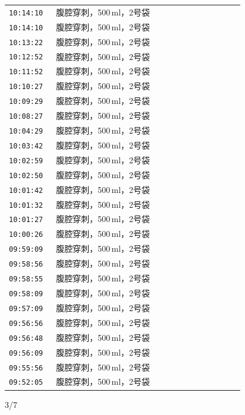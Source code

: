 \documentclass[UTF8,10pt,a4paper,fontset=fandol]{ctexart}
\newcommand{\handwritten}[1]{#1}
\begin{document}
\begin{tabular}{p{0.18\linewidth}p{0.72\linewidth}}
\texttt{10:14:10} & 腹腔穿刺，500\,ml，2号袋 \\
\texttt{10:14:10} & 腹腔穿刺，500\,ml，2号袋 \\
\texttt{10:13:22} & 腹腔穿刺，500\,ml，2号袋 \\
\texttt{10:12:52} & 腹腔穿刺，500\,ml，2号袋 \\
\texttt{10:11:52} & 腹腔穿刺，500\,ml，2号袋 \\
\texttt{10:10:27} & 腹腔穿刺，500\,ml，2号袋 \\
\texttt{10:09:29} & 腹腔穿刺，500\,ml，2号袋 \\
\texttt{10:08:27} & 腹腔穿刺，500\,ml，2号袋 \\
\texttt{10:04:29} & 腹腔穿刺，500\,ml，2号袋 \\
\texttt{10:03:42} & 腹腔穿刺，500\,ml，2号袋 \\
\texttt{10:02:59} & 腹腔穿刺，500\,ml，2号袋 \\
\texttt{10:02:50} & 腹腔穿刺，500\,ml，2号袋 \\
\texttt{10:01:42} & 腹腔穿刺，500\,ml，2号袋 \\
\texttt{10:01:32} & 腹腔穿刺，500\,ml，2号袋 \\
\texttt{10:01:27} & 腹腔穿刺，500\,ml，2号袋 \\
\texttt{10:00:26} & 腹腔穿刺，500\,ml，2号袋 \\
\texttt{09:59:09} & 腹腔穿刺，500\,ml，2号袋 \\
\texttt{09:58:56} & 腹腔穿刺，500\,ml，2号袋 \\
\texttt{09:58:55} & 腹腔穿刺，500\,ml，2号袋 \\
\texttt{09:58:09} & 腹腔穿刺，500\,ml，2号袋 \\
\texttt{09:57:09} & 腹腔穿刺，500\,ml，2号袋 \\
\texttt{09:56:56} & 腹腔穿刺，500\,ml，2号袋 \\
\texttt{09:56:48} & 腹腔穿刺，500\,ml，2号袋 \\
\texttt{09:56:09} & 腹腔穿刺，500\,ml，2号袋 \\
\texttt{09:55:56} & 腹腔穿刺，500\,ml，2号袋 \\
\texttt{09:52:05} & 腹腔穿刺，500\,ml，2号袋 \\
\end{tabular}

\handwritten{3/7}
\end{document}
